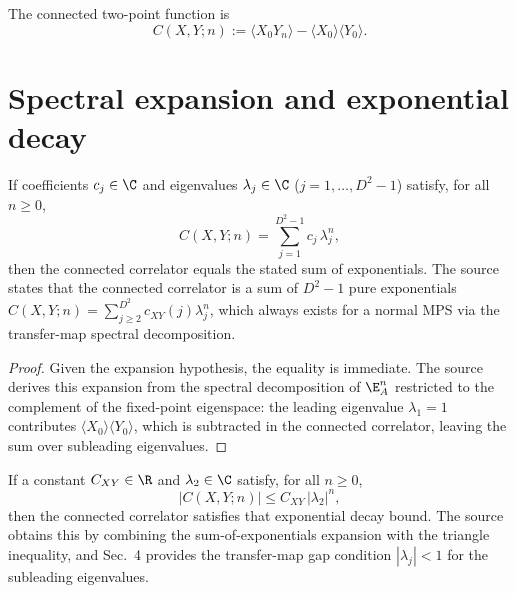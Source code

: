 \begin{definition}\label{def:connected_correlator}
    \leanok
    The connected two-point function is
    \[
        C(X,Y;n) := \langle X_0Y_n\rangle - \langle X_0\rangle\langle Y_0\rangle.
    \]
\end{definition}

\section{Spectral expansion and exponential decay}

\begin{theorem}%
    \label{thm:correlator_sum_exponentials}
    \leanok
    If coefficients $c_j\in\C$ and eigenvalues $\lambda_j\in\C$
    ($j=1,\dots,D^2-1$) satisfy, for all $n\ge 0$,
    \[
        C(X,Y;n) = \sum_{j=1}^{D^2-1} c_j\,\lambda_j^n,
    \]
    then the connected correlator equals the stated sum of exponentials.
    The source~\cite[Section~II.B.3]{Cirac2021Matrix} states that the connected
    correlator is a sum of $D^2-1$ pure exponentials
    $C(X,Y;n) = \sum_{j\ge 2}^{D^2} c_{XY}(j)\lambda_j^n$,
    which always exists for a normal MPS via the transfer-map spectral decomposition.
\end{theorem}

\begin{proof}
    \leanok
    Given the expansion hypothesis, the equality is immediate.
    The source~\cite[Section~II.B.3]{Cirac2021Matrix} derives this expansion
    from the spectral decomposition of $\E_A^n$ restricted to the
    complement of the fixed-point eigenspace: the leading eigenvalue
    $\lambda_1=1$ contributes $\langle X_0\rangle\langle Y_0\rangle$,
    which is subtracted in the connected correlator, leaving the sum
    over subleading eigenvalues.
\end{proof}

\begin{theorem}%
    \label{thm:correlator_exponential_bound}
    \leanok
    If a constant $C_{XY}\in\R$ and $\lambda_2\in\C$ satisfy, for all $n\ge 0$,
    \[
        |C(X,Y;n)| \le C_{XY}\,|\lambda_2|^n,
    \]
    then the connected correlator satisfies that exponential decay bound.
    The source~\cite[Section~II.B.3]{Cirac2021Matrix} obtains this by combining
    the sum-of-exponentials expansion with the triangle inequality, and
    Sec.~4 provides the transfer-map gap condition $|\lambda_j|<1$ for the
    subleading eigenvalues.
\end{theorem}


